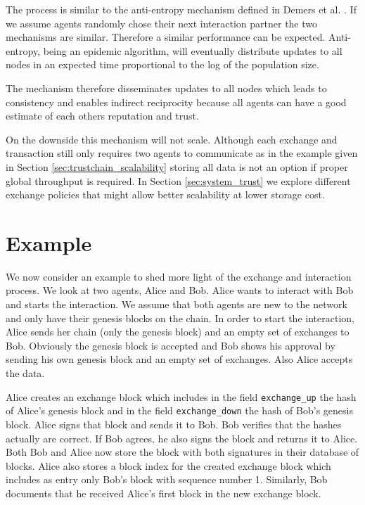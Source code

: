 The process is similar to the anti-entropy mechanism defined 
in Demers et al. \cite{demers1987epidemic}. If we assume agents randomly chose their next interaction
partner the two mechanisms are similar. Therefore a similar performance can be expected. Anti-entropy,
being an epidemic algorithm, will eventually distribute updates to all nodes in an expected time 
proportional to the log of the population size.

The mechanism therefore disseminates updates to all nodes which leads to consistency and enables 
indirect reciprocity because all agents can have a good estimate of each others reputation and trust.

On the downside this mechanism will not scale. Although each exchange and 
transaction still only requires two agents to communicate as in the example given in 
Section \ref{sec:trustchain_scalability} storing all data is not an option if proper global throughput
is required. In Section \ref{sec:system_trust} we explore different exchange policies that might 
allow better scalability at lower storage cost.

\section{Example}
We now consider an example to shed more light of the exchange and interaction process. We look at two
agents, Alice and Bob. Alice wants to interact with Bob and starts the interaction. We assume that
both agents are new to the network and only have their genesis blocks on the chain. In order to
start the interaction, Alice sends her chain (only the genesis block) and an empty set of exchanges
to Bob. Obviously the genesis block is accepted and Bob shows his approval by sending his own
genesis block and an empty set of exchanges. Also Alice accepts the data. 

Alice creates an exchange
block which includes in the field \verb|exchange_up| the hash of Alice's genesis block and in the field 
\verb|exchange_down| the hash of Bob's genesis block. Alice signs that block and sends it to Bob. 
Bob verifies that the hashes actually are correct. If Bob agrees, he also signs the block and returns 
it to Alice. Both Bob and Alice now store the block with both signatures in their database of blocks.
Alice also stores a block index for the created exchange block which includes as entry 
only Bob's block with sequence number 1. Similarly, Bob documents that he received Alice's first block
in the new exchange block.

